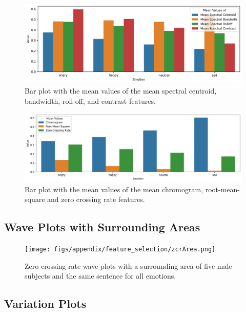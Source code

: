 \begin{figure}[H]
	\centering
	\includegraphics[width=\textwidth]{figs/appendix/feature_selection/meanSpectralFeatBarPlot.png}
	\caption{Bar plot with the mean values of the mean spectral centroid, bandwidth, roll-off, and contrast features.}
	\label{fig:meanSpectralFeatBarPlot}
\end{figure}

\begin{center}
	\begin{figure}[H]
		\centering
		\includegraphics[width=\linewidth]{figs/appendix/feature_selection/meanOtherFeatBarPlot.png}
		\caption{Bar plot with the mean values of the mean chromogram, root-mean-square and zero crossing rate features.}
		\label{fig:meanFeatBarPlot}
	\end{figure}
\end{center}


\subsection{Wave Plots with Surrounding Areas} \label{app:3}

\begin{figure}[H]
	\centering
	\texttt{[image: figs/appendix/feature\_selection/zcrArea.png]}
	\caption{Zero crossing rate wave plots with a surrounding area of five male subjects and the same sentence for all emotions.}
	\label{fig:zcrArea}
\end{figure}


\subsection{Variation Plots}  \label{app:4}


